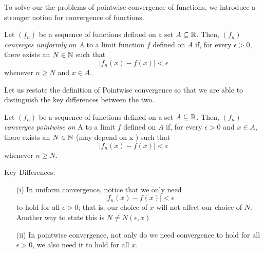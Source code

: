 To solve our the problems of pointwise convergence of functions, we introduce a stronger notion for convergence of functions.

\begin{definition}
    Let \( (f_n)  \) be a sequence of functions defined on a set \( A \subseteq \mathbb{R}  \). Then, \( (f_n)  \) \textit{converges uniformly} on \( A  \) to a limit function \( f  \) defined on \( A  \) if, for every \( \epsilon  > 0 \), there exists an \( N \in \mathbb{N}  \) such that 
    \[  | f_n(x) - f(x)  | < \epsilon   \]
    whenever \( n \geq N  \) and \( x \in A  \).
    \end{definition}

Let us restate the definition of Pointwise convergence so that we are able to distinguish the key differences between the two.

\begin{definition}
    Let \( (f_n)  \) be a sequence of functions defined on a set \( A \subseteq \mathbb{R}  \). Then, \( (f_n)  \) \textit{converges pointwise on} A to a limit \( f  \) defined on \( A  \) if, for every \( \epsilon > 0   \) and \( x \in A  \), there exists an \( N \in \mathbb{N}  \) (may depend on x ) such that 
    \[  | f_n(x) - f(x)  | < \epsilon  \] whenever \( n \geq N  \).
    \end{definition}

Key Differences:
\begin{enumerate}
    \item[(i)] In uniform convergence, notice that we only need 
        \[ | f_n(x) - f(x)  | < \epsilon  \] to hold for all \( \epsilon > 0  \); that is, our choice of \( x    \) will not affect our choice of \( N  \). Another way to state this is \( N \neq N(\epsilon, x ) \)
    \item[(ii)] In pointwise convergence, not only do we need convergence to hold for all \( \epsilon > 0   \), we also need it to hold for all \( x  \).
\end{enumerate}

